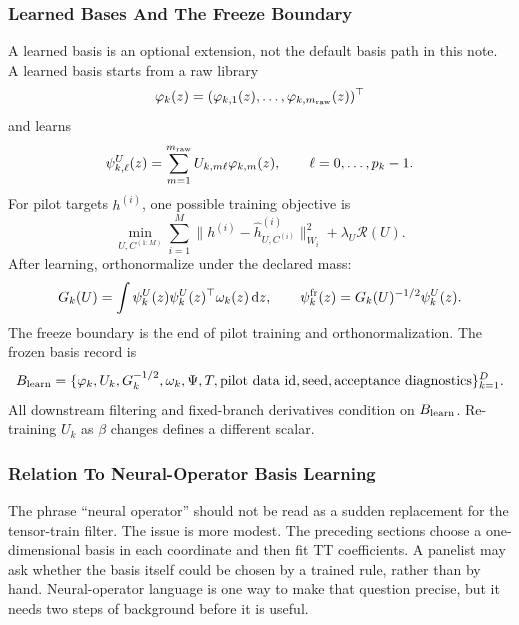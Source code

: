 \documentclass[11pt]{article}
\numberwithin{equation}{section}
\newcommand{\dd}{\,\mathrm d}
\begin{document}
\subsubsection{Learned Bases And The Freeze Boundary}

A learned basis is an optional extension, not the default basis path in this
note.
A learned basis starts from a raw library
\begin{equation}
    \varphi_k(z)
    =
    (\varphi_{k,1}(z),\ldots,\varphi_{k,m_{\rm raw}}(z))^\top
    \label{eq:p33-raw-library}
\end{equation}
and learns
\begin{equation}
    \psi_{k,\ell}^{U}(z)
    =
    \sum_{m=1}^{m_{\rm raw}}U_{k,m\ell}\varphi_{k,m}(z),
    \qquad \ell=0,\ldots,p_k-1.
    \label{eq:p33-learned-basis}
\end{equation}
For pilot targets \(h^{(i)}\), one possible training objective is
\begin{equation}
    \min_{U,C^{(1:M)}}
    \sum_{i=1}^{M}
    \|h^{(i)}-\widehat h_{U,C^{(i)}}^{(i)}\|_{W_i}^2
    +
    \lambda_U\mathcal R(U).
    \label{eq:p33-learned-objective}
\end{equation}
After learning, orthonormalize under the declared mass:
\begin{equation}
    G_k(U)=\int \psi_k^{U}(z)\psi_k^{U}(z)^\top\omega_k(z)\dd z,
    \qquad
    \psi_k^{\rm fr}(z)=G_k(U)^{-1/2}\psi_k^{U}(z).
    \label{eq:p33-learned-orthonormalize}
\end{equation}
The freeze boundary is the end of pilot training and orthonormalization.  The
frozen basis record is
\begin{equation}
    B_{\rm learn}
    =
    \{\varphi_k,U_k,G_k^{-1/2},\omega_k,\Psi,T,\text{pilot data id},
      \text{seed},\text{acceptance diagnostics}\}_{k=1}^D.
    \label{eq:p33-learned-artifact}
\end{equation}
All downstream filtering and fixed-branch derivatives condition on
\(B_{\rm learn}\).  Re-training \(U_k\) as \(\beta\) changes defines a
different scalar.

\subsubsection{Relation To Neural-Operator Basis Learning}

The phrase ``neural operator'' should not be read as a sudden replacement for
the tensor-train filter.  The issue is more modest.  The preceding sections
choose a one-dimensional basis in each coordinate and then fit TT
coefficients.  A panelist may ask whether the basis itself could be chosen by
a trained rule, rather than by hand.  Neural-operator language is one way to
make that question precise, but it needs two steps of background before it is
useful.
\end{document}
